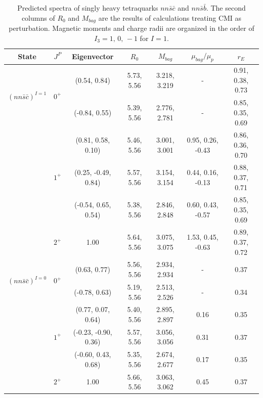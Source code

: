 \documentclass[prt,twocolumn,floatfix,nofootinbib]{revtex4}
\begin{document}
\renewcommand{\tabcolsep}{0.34cm}
\renewcommand{\arraystretch}{1.3}
\begin{table}[!htbp]
    \caption{Predicted spectra of singly heavy tetraquarks $nn\bar{s}\bar{c}$ and $nn\bar{s}\bar{b}$.
    The second columns of $R_{0}$ and $M_{bag}$ are the results of calculations treating CMI as perturbation.
    Magnetic moments and charge radii are organized in the order of $I_{3}=1,\,0,\,-1$ for $I=1$.}
    \label{tab:1heavytetraquark}
    \begin{tabular}{ccccccc}
        \hline\hline
        {\rm State}     &$J^{P}$    &{\rm Eigenvector}      &$R_{0}$        &$M_{bag}$          &$\mu_{bag}/\mu_{p}$    &$r_{E}$ \\ \hline
        \multirow{2}{*}{${(nn\bar{s}\bar{c})}^{I=1}$}
                        &\multirow{2}{*}{$0^{+}$}
                                    &(0.54, 0.84)           &5.73, 5.56	    &3.218, 3.219	    &-                      &0.91, 0.38, 0.73 \\
                        &           &(-0.84, 0.55)          &5.39, 5.56	    &2.776, 2.781	    &-                      &0.85, 0.35, 0.69 \\
                        &\multirow{3}{*}{$1^{+}$}
                                    &(0.81, 0.58, 0.10)     &5.46, 5.56	    &3.001, 3.001	    &0.95, 0.26, -0.43      &0.86, 0.36, 0.70 \\
                        &           &(0.25, -0.49, 0.84)    &5.57, 5.56	    &3.154, 3.154	    &0.44, 0.16, -0.13      &0.88, 0.37, 0.71 \\
                        &           &(-0.54, 0.65, 0.54)    &5.38, 5.56	    &2.846, 2.848	    &0.60, 0.43, -0.57      &0.85, 0.35, 0.69 \\
                        &$2^{+}$    &1.00                   &5.64, 5.56	    &3.075, 3.075	    &1.53, 0.45, -0.63      &0.89, 0.37, 0.72 \\
        \multirow{2}{*}{${(nn\bar{s}\bar{c})}^{I=0}$}
                        &\multirow{2}{*}{$0^{+}$}
                                    &(0.63, 0.77)           &5.56, 5.56	    &2.934, 2.934	    &-                      &0.37 \\
                        &           &(-0.78, 0.63)          &5.19, 5.56	    &2.513, 2.526	    &-                      &0.34 \\
                        &\multirow{3}{*}{$1^{+}$}
                                    &(0.77, 0.07, 0.64)     &5.40, 5.56	    &2.895, 2.897	    &0.16                   &0.35 \\
                        &           &(-0.23, -0.90, 0.36)   &5.57, 5.56	    &3.056, 3.056	    &0.31                   &0.37 \\
                        &           &(-0.60, 0.43, 0.68)    &5.35, 5.56	    &2.674, 2.677	    &0.17                   &0.35 \\
                        &$2^{+}$    &1.00                   &5.66, 5.56	    &3.063, 3.062	    &0.45                   &0.37 \\


\end{tabular}
\end{table}
\end{document}
